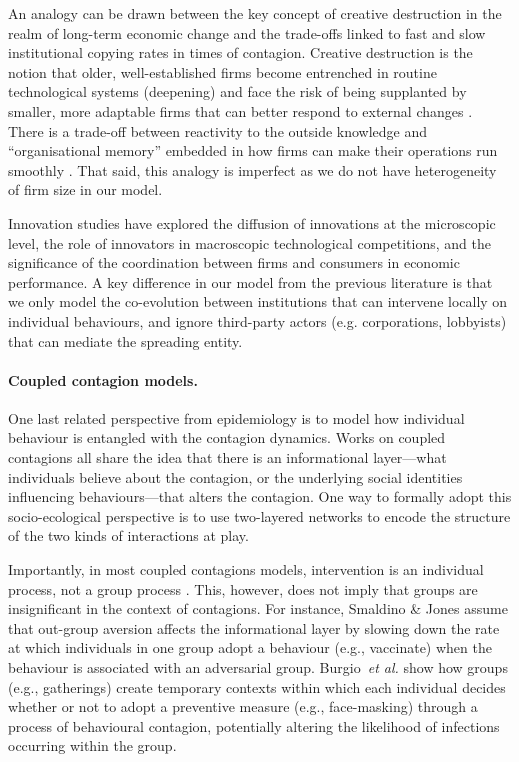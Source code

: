An analogy can be drawn between the key concept of creative destruction in the realm of long-term economic change and the trade-offs linked to fast and slow institutional copying rates in times of contagion. Creative destruction is the notion that older, well-established firms become entrenched in routine technological systems (deepening) and face the risk of being supplanted by smaller, more adaptable firms that can better respond to external changes \cite{ breschi_technological_2000, fagerberg_innovation_2006}. There is a trade-off between reactivity to the outside knowledge and ``organisational memory'' embedded in how firms can make their operations run smoothly \cite{cohen_empirical_1989}. That said, this analogy is imperfect as we do not have heterogeneity of firm size in our model. 

Innovation studies have explored the diffusion of innovations at the microscopic level, the role of innovators in macroscopic technological competitions, and the significance of the coordination between firms and consumers in economic performance. 
A key difference in our model from the previous literature is that we only model the co-evolution between institutions that can intervene locally on individual behaviours, and ignore third-party actors (e.g. corporations, lobbyists) that can mediate the spreading entity.


\paragraph*{Coupled contagion models.} One last related perspective from epidemiology is to model how individual behaviour is entangled with the contagion dynamics. Works on coupled contagions \cite{epstein_coupled_2007,funk_spread_2009,funk_endemic_2010,funk_modelling_2010,karrer_competing_2011,granell_dynamical_2013,fu_dueling_2017,hebert-dufresne_spread_2020,peng_multilayer_2021,qiu_understanding_2022,morsky_impact_2023,saad-roy_dynamics_2023,wu_impact_2012,marceau_modeling_2011}
all share the idea that there is an informational layer---what individuals believe about the contagion, or the underlying social identities influencing behaviours---that alters the contagion. One way to formally adopt this socio-ecological perspective is to use two-layered networks to encode the structure of the two kinds of interactions at play.

Importantly, in most coupled contagions models, intervention is an individual process, not a group process \cite{wang_coupled_2015, chang_game_2020, bedson_review_2021}. This, however, does not imply that groups are insignificant in the context of contagions. For instance, Smaldino \& Jones \cite{smaldino_coupled_2021} assume that out-group aversion affects the informational layer by slowing down the rate at which individuals in one group adopt a behaviour (e.g., vaccinate) when the behaviour is associated with an adversarial group. Burgio~\textit{et al.} \cite{burgio_adaptive_2023} show how groups (e.g., gatherings) create temporary contexts within which each individual decides whether or not to adopt a preventive measure (e.g., face-masking) through a process of behavioural contagion, potentially altering the likelihood of infections occurring within the group.

